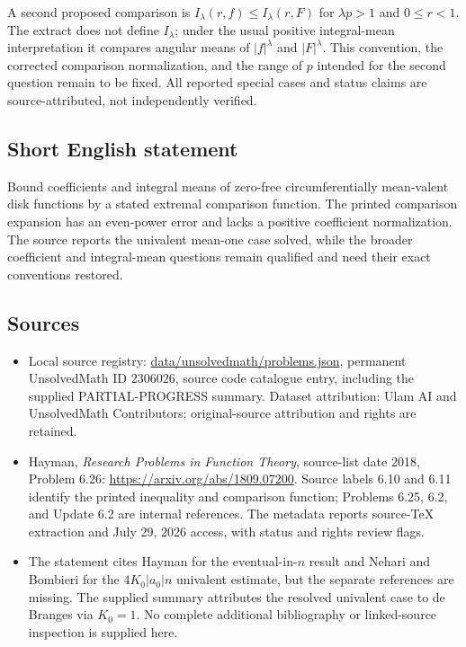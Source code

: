 \documentclass[11pt]{article}
\begin{document}
A second proposed comparison is $I_\lambda(r,f)\le I_\lambda(r,F)$ for $\lambda p>1$ and $0\le r<1$. The extract does not define $I_\lambda$; under the usual positive integral-mean interpretation it compares angular means of $|f|^\lambda$ and $|F|^\lambda$. This convention, the corrected comparison normalization, and the range of $p$ intended for the second question remain to be fixed. All reported special cases and status claims are source-attributed, not independently verified.
\subsection{Short English statement}
Bound coefficients and integral means of zero-free circumferentially mean-valent disk functions by a stated extremal comparison function. The printed comparison expansion has an even-power error and lacks a positive coefficient normalization. The source reports the univalent mean-one case solved, while the broader coefficient and integral-mean questions remain qualified and need their exact conventions restored.
\subsection{Sources}
\begin{itemize}
\item Local source registry: \url{data/unsolvedmath/problems.json}, permanent UnsolvedMath ID $2306026$, source code catalogue entry, including the supplied PARTIAL-PROGRESS summary. Dataset attribution: Ulam AI and UnsolvedMath Contributors; original-source attribution and rights are retained.
\item Hayman, \emph{Research Problems in Function Theory}, source-list date 2018, Problem 6.26: \url{https://arxiv.org/abs/1809.07200}. Source labels 6.10 and 6.11 identify the printed inequality and comparison function; Problems 6.25, 6.2, and Update 6.2 are internal references. The metadata reports source-TeX extraction and July 29, 2026 access, with status and rights review flags.
\item The statement cites Hayman for the eventual-in-$n$ result and Nehari and Bombieri for the $4K_0|a_0|n$ univalent estimate, but the separate references are missing. The supplied summary attributes the resolved univalent case to de Branges via $K_0=1$. No complete additional bibliography or linked-source inspection is supplied here.
\end{itemize}
\end{document}
